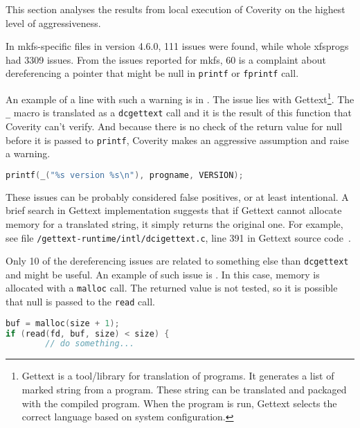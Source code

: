 This section analyses the results from local execution of Coverity on the
highest level of aggressiveness.

In mkfs-specific files in version 4.6.0, 111 issues were found, while whole xfsprogs
had 3309 issues. From the issues reported for mkfs, 60 is a complaint about
dereferencing a pointer that might be null in {\tt printf} or {\tt fprintf}
call.

An example of a line with such a warning is in
. The issue lies with
Gettext\footnote{Gettext is a tool/library for translation of programs. It
generates a list of marked string from a program. These string can be
translated and packaged with the compiled program. When the program is run,
Gettext selects the correct language based on system configuration.}. The {\tt
\_}
macro is translated as a {\tt dcgettext} call and it is the result of this
function that Coverity can't verify. And because there is no check of the
return value for null before it is passed to {\tt printf}, Coverity makes an
aggressive assumption and raise a warning.

\begin{lstlisting}[frame=none, basicstyle=\footnotesize\ttfamily,
language=C, numbers=none, numberstyle=\tiny\color{black},caption=
{{\tt xfs\_mkfs.c:1713}: Line which is reportedly dereferencing a potentially
null pointer with Gettext},
label={lst:results:dereferencePrintf}]
printf(_("%s version %s\n"), progname, VERSION);
\end{lstlisting}

These issues can be probably considered false positives, or at least
intentional. A brief search in Gettext implementation suggests that if Gettext
cannot allocate memory for a translated string, it simply returns the original
one. For example, see file {\tt /gettext-runtime/intl/dcigettext.c}, line 391
in Gettext source code~\cite{GettextGit}.

Only 10 of the dereferencing issues are related to something else
than {\tt dcgettext} and might be useful. An example of such issue is
.  In this case, memory is allocated with a
{\tt malloc} call. The returned value is not tested, so it is possible that
null is passed to the {\tt read} call.

\begin{lstlisting}[frame=none, basicstyle=\footnotesize\ttfamily,
language=C, numbers=none, numberstyle=\tiny\color{black},caption=
{{\tt proto.c:66}: Line which is reportedly dereferencing a potentially null
pointer - no malloc check.},
label={lst:results:dereferenceBuf}]
buf = malloc(size + 1);
if (read(fd, buf, size) < size) {
        // do something...
\end{lstlisting}

